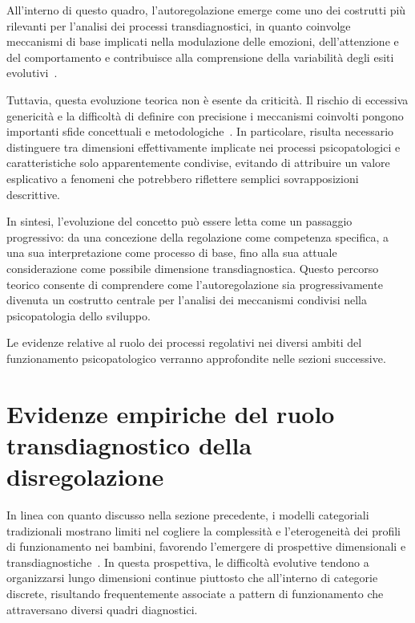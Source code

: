             All'interno di questo quadro, l'autoregolazione emerge come uno dei costrutti più rilevanti per l'analisi dei processi transdiagnostici, in quanto coinvolge meccanismi di base implicati nella modulazione delle emozioni, dell'attenzione e del comportamento e contribuisce alla comprensione della variabilità degli esiti evolutivi~\cite{calkins2007}.

            Tuttavia, questa evoluzione teorica non è esente da criticità. Il rischio di eccessiva genericità e la difficoltà di definire con precisione i meccanismi coinvolti pongono importanti sfide concettuali e metodologiche~\cite{nolenhoeksema2011}. In particolare, risulta necessario distinguere tra dimensioni effettivamente implicate nei processi psicopatologici e caratteristiche solo apparentemente condivise, evitando di attribuire un valore esplicativo a fenomeni che potrebbero riflettere semplici sovrapposizioni descrittive.

            In sintesi, l'evoluzione del concetto può essere letta come un passaggio progressivo: da una concezione della regolazione come competenza specifica, a una sua interpretazione come processo di base, fino alla sua attuale considerazione come possibile dimensione transdiagnostica. Questo percorso teorico consente di comprendere come l'autoregolazione sia progressivamente divenuta un costrutto centrale per l'analisi dei meccanismi condivisi nella psicopatologia dello sviluppo.

            Le evidenze relative al ruolo dei processi regolativi nei diversi ambiti del funzionamento psicopatologico verranno approfondite nelle sezioni successive.

    \section{Evidenze empiriche del ruolo transdiagnostico della disregolazione}
    \label{sec:2_3}

        In linea con quanto discusso nella sezione precedente, i modelli categoriali tradizionali mostrano limiti nel cogliere la complessità e l'eterogeneità dei profili di funzionamento nei bambini, favorendo l'emergere di prospettive dimensionali e transdiagnostiche~\cite{cicchetti2009,astle2022}. In questa prospettiva, le difficoltà evolutive tendono a organizzarsi lungo dimensioni continue piuttosto che all'interno di categorie discrete, risultando frequentemente associate a pattern di funzionamento che attraversano diversi quadri diagnostici.

